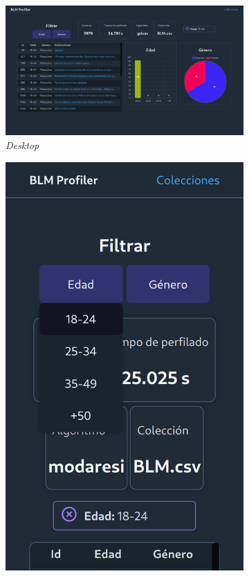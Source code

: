 \begin{figure}[H]
  \centering
  \begin{subfigure}{0.7\textwidth}
   \includegraphics[width=\textwidth]{imaxes/capturas-app/desktop/dashboard-perfilado-edad.png}
  \caption{\textit{Desktop}} 
  \end{subfigure}
  \begin{subfigure}{0.223\textwidth}
   \includegraphics[width=\textwidth]{imaxes/capturas-app/mobile/dashboard-filtrado-edad.png}

\end{subfigure}
\end{figure}
